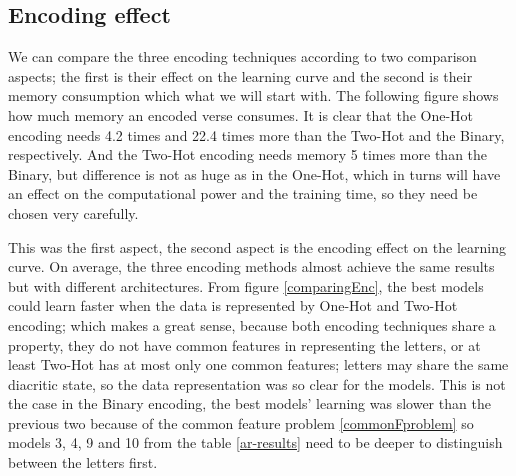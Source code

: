 \subsection{Encoding effect}
We can compare the three encoding techniques according to two comparison aspects; the
first is their effect on the learning curve and the second is their  memory
consumption  which what we will start with. The following figure shows how much
memory an encoded verse consumes.  It is clear that the One-Hot encoding needs
4.2 times and 22.4 times more than the Two-Hot and the Binary, respectively. And
the Two-Hot encoding needs memory 5 times more than the Binary, but difference is
not as huge as in the One-Hot, which in turns will have an effect on the
computational power and the training time, so they need be chosen very carefully. 
\begin{center}

\end{center}

This was the first aspect, the second aspect is the encoding effect on the
learning curve. On average, the three encoding methods almost achieve the same
results but with different architectures. From figure \ref{comparingEnc}, the
best models could learn faster when the data is represented by One-Hot and
Two-Hot encoding; which makes a great sense, because both encoding techniques
share a property, they do not have common features in representing the letters,
or at least Two-Hot has at most only one common features; letters may share the
same diacritic state, so the data representation was so clear for the models.
This is not the case in the Binary encoding, the
best models' learning was slower than the previous two  because of the common
feature problem \ref{commonFproblem} so models 3, 4, 9 and 10 from the table
\ref{ar-results} need to be deeper to %
distinguish between the letters first. 

 



\begin{center}

\label{comparingEnc}
\end{center}


